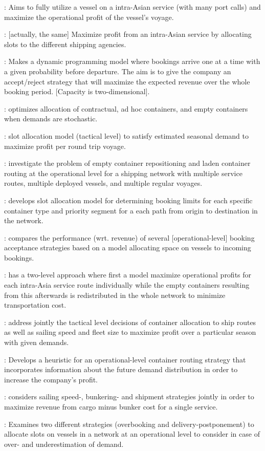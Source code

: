 \citet{Feng07}: Aims to fully utilize a vessel on a intra-Asian service (with many port calls) and maximize the operational profit of the vessel's voyage.

\citet{Feng08}: [actually, the same] Maximize profit from an intra-Asian service by allocating slots to the different shipping agencies.

\citet{Bingzhou08}: Makes a dynamic programming model where bookings arrive one at a time with a given probability before departure. The aim is to give the company an accept/reject strategy that will maximize the expected revenue over the whole booking period. [Capacity is two-dimensional].

\citet{Zou08}: optimizes allocation of contractual, ad hoc containers, and empty containers when demands are stochastic.

\citet{Lu10}: slot allocation model (tactical level) to satisfy estimated seasonal demand to maximize profit per round trip voyage.

\citet{Song12}: investigate the problem of empty container repositioning and laden container routing at the operational level for a shipping network with multiple service routes, multiple deployed vessels, and multiple regular voyages.

\citet{Zurheide12}: develops slot allocation model for determining booking limits for each specific container type and priority segment for a each path from origin to destination in the network.  

\citet{Zurheide15}: compares the performance (wrt. revenue) of several [operational-level] booking acceptance strategies based on a model allocating space on vessels to incoming bookings. 

\citet{Chang15}: has a two-level approach where first a model maximize operational profits for each intra-Asia service route individually while the empty containers resulting from this afterwards is redistributed in the whole network to minimize transportation cost.  

\citet{Wang15b}: address jointly the tactical level decisions of container allocation to ship routes as well as sailing speed and fleet size to maximize profit over a particular season with given demands.

\citet{Zhen17}: Develops a heuristic for an operational-level container routing strategy that incorporates information about the future demand distribution in order to increase the company's profit.

\citet{Wang19a}: considers sailing speed-, bunkering- and shipment strategies jointly in order to maximize revenue from cargo minus bunker cost for a single service.

\citet{Wang19b}: Examines two different strategies (overbooking and delivery-postponement) to allocate slots on vessels in a network at an operational level to consider in case of over- and underestimation of demand.

